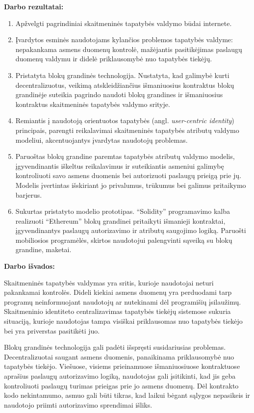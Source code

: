 
\textbf{Darbo rezultatai:}

\begin{enumerate}
    \item Apžvelgti pagrindiniai skaitmeninės tapatybės valdymo būdai internete.
    \item Įvardytos esminės naudotojams kylančios problemos tapatybės valdyme: nepakankama asmens duomenų
    kontrolė, mažėjantis pasitikėjimas paslaugų duomenų valdymu ir didelė priklausomybė nuo tapatybės tiekėjų.
    \item Pristatyta blokų grandinės technologija. Nustatyta, kad galimybė kurti
    decentralizuotus, veikimą atskleidžiančius išmaniuosius kontraktus blokų grandinėje suteikia pagrindo
    naudoti blokų grandines ir išmaniuosius kontraktus skaitmeninės tapatybės valdymo srityje. 
    \item Remiantis į naudotoją orientuotos tapatybės (angl. \textit{user-centric identity}) principais,
    parengti reikalavimai skaitmeninės tapatybės atributų valdymo modeliui, akcentuojantys įvardytas naudotojų problemas.
    \item Paruoštas blokų grandine paremtas tapatybės atributų valdymo modelis, įgyvendinantis iškeltus reikalavimus
    ir suteikiantis asmeniui galimybę kontroliuoti savo asmens duomenis
    bei autorizuoti paslaugų prieigą prie jų. Modelis įvertintas išskiriant jo
    privalumus, trūkumus bei galimus pritaikymo barjerus.
    \item Sukurtas pristatyto modelio prototipas. \enquote{Solidity} programavimo kalba realizuoti \enquote{Ethereum} blokų grandinei pritaikyti
    išmanieji kontraktai, įgyvendinantys paslaugų autorizavimo ir atributų saugojimo logiką. Paruošti mobiliosios programėlės, skirtos
    naudotojui palengvinti sąveiką su blokų grandine, maketai.
\end{enumerate}

\textbf{Darbo išvados:}

Skaitmeninės tapatybės valdymas yra sritis, kurioje naudotojai neturi pakankamai kontrolės.
Dideli kiekiai asmens duomenų yra perduodami tarp programų neinformuojant naudotojų
ar nutekinami dėl programišių įsilaužimų. Skaitmeninio identiteto centralizavimas tapatybės tiekėjų sistemose
sukuria situaciją, kurioje naudotojas tampa visiškai priklausomas nuo tapatybės tiekėjo bei yra priverstas
pasitikėti juo.

Blokų grandinės technologija gali padėti išspręsti susidariusias problemas. Decentralizuotai saugant asmens duomenis,
panaikinama priklausomybė nuo tapatybės tiekėjo. Viešuose, visiems prieinamuose
išmaniuosiuose kontraktuose aprašius paslaugų autorizavimo logiką, naudotojas gali įsitikinti,
kad jis geba kontroliuoti paslaugų turimas prieigas prie jo asmens duomenų. Dėl kontrakto kodo
nekintamumo, asmuo gali būti tikras, kad laikui bėgant sąlygos nepasikeis ir naudotojo priimti
autorizavimo sprendimai išliks.

